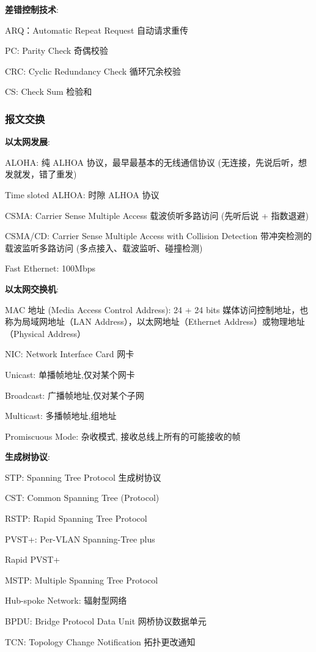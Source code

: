 \documentclass[UTF8,cs4size]{ctexart}
\begin{document}
\textbf{差错控制技术}:
\begin{compactitem}
  \item ARQ：Automatic Repeat Request 自动请求重传 
  \item PC: Parity Check 奇偶校验
  \item CRC: Cyclic Redundancy Check 循环冗余校验
  \item CS: Check Sum 检验和
\end{compactitem}

\subsubsection{报文交换}
\textbf{以太网发展}:
\begin{compactitem}
  \item ALOHA: 纯 ALHOA 协议，最早最基本的无线通信协议 (无连接，先说后听，想发就发，错了重发)
  \item Time sloted ALHOA: 时隙 ALHOA 协议
  \item CSMA: Carrier Sense Multiple Access 载波侦听多路访问 (先听后说 + 指数退避)
  \item CSMA/CD: Carrier Sense Multiple Access with Collision Detection 带冲突检测的载波监听多路访问 (多点接入、载波监听、碰撞检测)
  \item Fast Ethernet: 100Mbps
\end{compactitem}

\textbf{以太网交换机}:
\begin{compactitem}
  \item MAC 地址 (Media Access Control Address): 24 + 24 bits 媒体访问控制地址，也称为局域网地址（LAN Address），以太网地址（Ethernet Address）或物理地址（Physical Address）
  \item NIC: Network Interface Card 网卡
  \item Unicast: 单播帧地址,仅对某个网卡
  \item Broadcast: 广播帧地址,仅对某个子网
  \item Multicast: 多播帧地址,组地址
  \item Promiscuous Mode: 杂收模式, 接收总线上所有的可能接收的帧
\end{compactitem}

\textbf{生成树协议}:
\begin{compactitem}
  \item STP: Spanning Tree Protocol 生成树协议
  \item CST: Common Spanning Tree (Protocol)
  \item RSTP: Rapid Spanning Tree Protocol
  \item PVST+: Per-VLAN Spanning-Tree plus
  \item Rapid PVST+
  \item MSTP: Multiple Spanning Tree Protocol
  \item Hub-spoke Network: 辐射型网络
  \item BPDU: Bridge Protocol Data Unit 网桥协议数据单元
  \item TCN: Topology Change Notification 拓扑更改通知
\end{compactitem}
\end{document}
